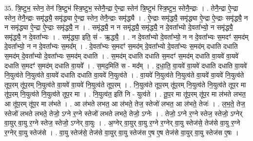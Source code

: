 \documentclass[17pt]{extarticle}
\begin{document}
35. त्रि॒ष्टुभ॒ स्तेन॒ तेन॑ त्रि॒ष्टुभ॑ स्त्रि॒ष्टुभ॒ स्तेनै॒न्द्रा ऐ॒न्द्रा स्तेन॑ त्रि॒ष्टुभ॑ स्त्रि॒ष्टुभ॒ स्तेनै॒न्द्राः । . तेनै॒न्द्रा ऐ॒न्द्रा स्तेन॒ तेनै॒न्द्राः समृ॑द्ध्यै॒ समृ॑द्ध्या ऐ॒न्द्रा स्तेन॒ तेनै॒न्द्राः समृ॑द्ध्यै । . ऐ॒न्द्राः समृ॑द्ध्यै॒ समृ॑द्ध्या ऐ॒न्द्रा ऐ॒न्द्राः समृ॑द्ध्यै॒ न न समृ॑द्ध्या ऐ॒न्द्रा ऐ॒न्द्राः समृ॑द्ध्यै॒ न । . समृ॑द्ध्यै॒ न न समृ॑द्ध्यै॒ समृ॑द्ध्यै॒ न दे॒वता᳚भ्यो दे॒वता᳚भ्यो॒ न समृ॑द्ध्यै॒ समृ॑द्ध्यै॒ न दे॒वता᳚भ्यः । . समृ॑द्ध्या॒ इति॒ सं - ऋ॒द्ध्यै॒ । . न दे॒वता᳚भ्यो दे॒वता᳚भ्यो॒ न न दे॒वता᳚भ्यः स॒मदꣳ॑ स॒मद॑म् दे॒वता᳚भ्यो॒ न न दे॒वता᳚भ्यः स॒मद᳚म् । . दे॒वता᳚भ्यः स॒मदꣳ॑ स॒मद॑म् दे॒वता᳚भ्यो दे॒वता᳚भ्यः स॒मद॑म् दधाति दधाति स॒मद॑म् दे॒वता᳚भ्यो दे॒वता᳚भ्यः स॒मद॑म् दधाति । . स॒मद॑म् दधाति दधाति स॒मदꣳ॑ स॒मद॑म् दधाति वा॒यवे॑ वा॒यवे॑ दधाति स॒मदꣳ॑ स॒मद॑म् दधाति वा॒यवे᳚ । . स॒मद॒मिति॑ स - मद᳚म् । . द॒धा॒ति॒ वा॒यवे॑ वा॒यवे॑ दधाति दधाति वा॒यवे॑ नि॒युत्व॑ते नि॒युत्व॑ते वा॒यवे॑ दधाति दधाति वा॒यवे॑ नि॒युत्व॑ते । . वा॒यवे॑ नि॒युत्व॑ते नि॒युत्व॑ते वा॒यवे॑ वा॒यवे॑ नि॒युत्व॑ते तूप॒रम् तू॑प॒रम् नि॒युत्व॑ते वा॒यवे॑ वा॒यवे॑ नि॒युत्व॑ते तूप॒रम् । . नि॒युत्व॑ते तूप॒रम् तू॑प॒रम् नि॒युत्व॑ते नि॒युत्व॑ते तूप॒र मा तू॑प॒रम् नि॒युत्व॑ते नि॒युत्व॑ते तूप॒र मा । . नि॒युत्व॑त॒ इति॑ नि - युत्व॑ते । . तू॒प॒र मा तू॑प॒रम् तू॑प॒र मा ल॑भते लभत॒ आ तू॑प॒रम् तू॑प॒र मा ल॑भते । . आ ल॑भते लभत॒ आ ल॑भते॒ तेज॒ स्तेजो॑ लभत॒ आ ल॑भते॒ तेजः॑ । . ल॒भ॒ते॒ तेज॒ स्तेजो॑ लभते लभते॒ तेजो॒ ऽग्ने र॒ग्ने स्तेजो॑ लभते लभते॒ तेजो॒ ऽग्नेः । . तेजो॒ ऽग्ने र॒ग्ने स्तेज॒ स्तेजो॒ ऽग्नेर् वा॒युर् वा॒यु र॒ग्ने स्तेज॒ स्तेजो॒ ऽग्नेर् वा॒युः । . अ॒ग्नेर् वा॒युर् वा॒यु र॒ग्ने र॒ग्नेर् वा॒यु स्तेज॑से॒ तेज॑से वा॒यु र॒ग्ने र॒ग्नेर् वा॒यु स्तेज॑से । . वा॒यु स्तेज॑से॒ तेज॑से वा॒युर् वा॒यु स्तेज॑स ए॒ष ए॒ष तेज॑से वा॒युर् वा॒यु स्तेज॑स ए॒षः । \newline
\end{document}
